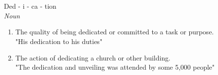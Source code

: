 \chapter*{}

Ded - i - ca - tion \\
\emph{Noun}
\begin{enumerate}
\item The quality of being dedicated or committed to a task or purpose. \\
"His dedication to his duties"
\item The action of dedicating a church or other building. \\
"The dedication and unveiling was attended by some 5,000 people"
\end{enumerate}